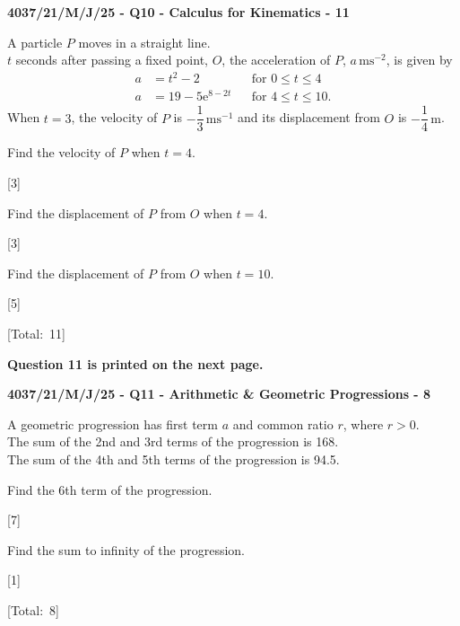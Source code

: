 \documentclass[11pt,a4paper]{article}
\renewcommand{\markright}[1]{\par\nopagebreak\noindent\hspace*{\fill}\mbox{#1}\par\vspace{1mm}}
\newcommand{\swmarks}{}
\newcommand{\examq}[4]{%
  \gdef\swmarks{#4}%
  \par\addvspace{16pt}\noindent
  {\large\bfseries #1 - Q#2 - #3 - #4}\par\vspace{5pt}%
}
\newcommand{\total}{\par\vspace{2mm}\noindent\hspace*{\fill}[Total:\ \swmarks]\par\vspace{2mm}}
\begin{document}
\examq{4037/21/M/J/25}{10}{Calculus for Kinematics}{11}
A particle $P$ moves in a straight line.\\
$t$ seconds after passing a fixed point, $O$, the acceleration of $P$, $a\,\mathrm{ms}^{-2}$, is given by
\[
\begin{aligned}
  a&=t^{2}-2 &&\text{for } 0\leqslant t\leqslant 4\\
  a&=19-5\mathrm{e}^{8-2t} &&\text{for } 4\leqslant t\leqslant 10.
\end{aligned}
\]
When $t=3$, the velocity of $P$ is $-\dfrac{1}{3}\,\mathrm{ms}^{-1}$ and its displacement from $O$ is $-\dfrac{1}{4}\,\mathrm{m}$.
\begin{parts}
  \item \begin{subparts}
    \item Find the velocity of $P$ when $t=4$.
    \markright{[3]}
    \vspace{6cm}

    \item Find the displacement of $P$ from $O$ when $t=4$.
    \markright{[3]}
    \vspace{9cm}
  \end{subparts}

  \item Find the displacement of $P$ from $O$ when $t=10$.
  \markright{[5]}
  \vspace{17cm}
\end{parts}
\total

\begin{center}\textbf{Question 11 is printed on the next page.}\end{center}

\examq{4037/21/M/J/25}{11}{Arithmetic \& Geometric Progressions}{8}
A geometric progression has first term $a$ and common ratio $r$, where $r>0$.\\
The sum of the 2nd and 3rd terms of the progression is 168.\\
The sum of the 4th and 5th terms of the progression is 94.5.
\begin{parts}
  \item Find the 6th term of the progression.
  \markright{[7]}
  \vspace{13cm}

  \item Find the sum to infinity of the progression.
  \markright{[1]}
  \vspace{5cm}
\end{parts}
\total
\end{document}
